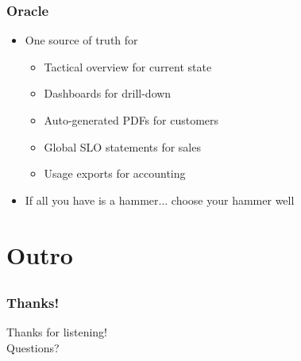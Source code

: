 \documentclass[aspectratio=169]{beamer}
\begin{document}
\begin{frame}
	\frametitle{Oracle}
	\begin{itemize}
		\item One source of truth for
		\begin{itemize}
			\item Tactical overview for current state
			\item Dashboards for drill-down
			\item Auto-generated PDFs for customers
			\item Global SLO statements for sales
			\item Usage exports for accounting
		\end{itemize}
	\item If all you have is a hammer... choose your hammer well
	\end{itemize}
\end{frame}








\section{Outro}

\subsection{}

\begin{frame}
	\frametitle{Thanks!}
		\begin{center}
			\vfill
			Thanks for listening!\\
			\vfill
			Questions?
			\vfill
		\end{center}
\end{frame}
\end{document}
